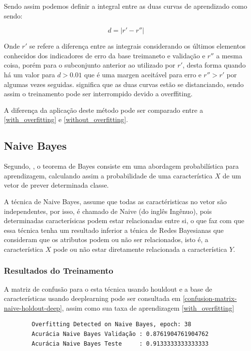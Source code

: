 \documentclass[
article,			%
11pt,				%
oneside,			%
a4paper,			%
english,			%
brazil,				%
sumario=tradicional,
]{abntex2}
\begin{document}
	Sendo assim podemos definir a integral entre as duas curvas de aprendizado como sendo:
	
	\begin{equation}
	d = |r' - r''|
	\end{equation}
	
	Onde \(r'\) se refere a diferença entre as integrais considerando os últimos elementos conhecidos dos indicadores de erro da base treimaneto e validação e \(r''\) a mesma coisa, porém para o subconjunto anterior ao utilizado por \(r'\), desta forma quando há um valor para \(d > 0.01\) que é uma margen aceitável para erro e \( r'' > r' \) por algumas vezes seguidas. significa que as duas curvas estão se distanciando, sendo assim o treinamento pode ser interrompido devido a overffiting.
	
	A diferença da aplicação deste método pode ser comparado entre a  \autoref{with_overfitting} e \autoref{without_overfitting}.
 	
	\subsection{Naive Bayes}
	
	Segundo, , o teorema de Bayes consiste em uma abordagem probabilística para aprendizagem, calculando assim a probabilidade de uma característica \(X\) de um vetor de prever determinada classe.
	
	A técnica de Naive Bayes, assume que todas as caractéristicas no vetor são independentes, por isso, é chamado de Naive (do inglês Ingênuo), pois determinadas caracterísicas podem estar relacionadas entre si, o que faz com que essa técnica tenha um resultado inferior a ténica de Redes Bayesianas que consideram que os atributos podem ou não ser relacionados, isto é, a característica \(X\) pode ou não estar diretamente relacionada a característica \(Y\).
	
	\subsubsection{Resultados do Treinamento}
	
	A matriz de confusão para o esta técnica usando houldout e a base de características usando deeplearning pode ser consultada em \autoref{confusion-matrix-naive-holdout-deep}, assim como sua taxa de aprendizagem \autoref{with_overfitting}
	
	\begin{verbatim}
		Overfitting Detected on Naive Bayes, epoch: 38
		Acurácia Naive Bayes Validação : 0.8761904761904762
		Acurácia Naive Bayes Teste     : 0.9133333333333333
	\end{verbatim}
	
\end{document}

